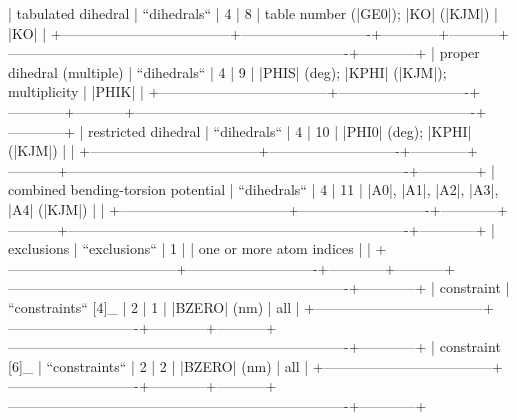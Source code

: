             | tabulated dihedral                 | ``dihedrals``              | 4          | 8         | table number (|GE0|); |KO| (|KJM|)                                      | |KO|       |
            +------------------------------------+----------------------------+------------+-----------+-------------------------------------------------------------------------+------------+
            | proper dihedral (multiple)         | ``dihedrals``              | 4          | 9         | |PHIS| (deg); |KPHI| (|KJM|); multiplicity                              | |PHIK|     | 
            +------------------------------------+----------------------------+------------+-----------+-------------------------------------------------------------------------+------------+
            | restricted dihedral                | ``dihedrals``              | 4          | 10        | |PHI0| (deg); |KPHI| (|KJM|)                                            |            | 
            +------------------------------------+----------------------------+------------+-----------+-------------------------------------------------------------------------+------------+
            | combined bending-torsion potential | ``dihedrals``              | 4          | 11        | |A0|, |A1|, |A2|, |A3|, |A4| (|KJM|)                                    |            | 
            +------------------------------------+----------------------------+------------+-----------+-------------------------------------------------------------------------+------------+
            | exclusions                         | ``exclusions``             | 1          |           | one or more atom indices                                                |            | 
            +------------------------------------+----------------------------+------------+-----------+-------------------------------------------------------------------------+------------+
            | constraint                         | ``constraints`` [4]_       | 2          | 1         | |BZERO| (nm)                                                            | all        | 
            +------------------------------------+----------------------------+------------+-----------+-------------------------------------------------------------------------+------------+
            | constraint [6]_                    | ``constraints``            | 2          | 2         | |BZERO| (nm)                                                            | all        | 
            +------------------------------------+----------------------------+------------+-----------+-------------------------------------------------------------------------+------------+
